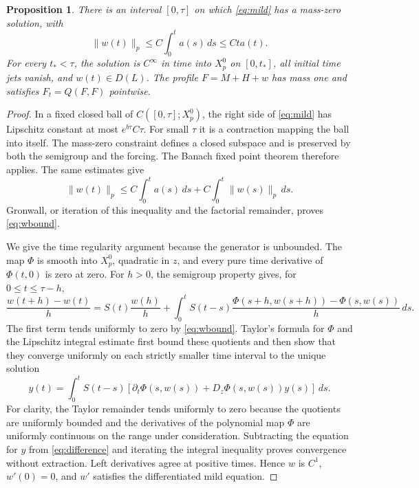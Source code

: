 \documentclass[11pt,a4paper]{article}
\numberwithin{equation}{section}
\newtheorem{proposition}[theorem]{Proposition}
\theoremstyle{remark}
\newcommand{\dd}{\,d}
\newcommand{\norm}[2]{\lVert #1\rVert_{#2}}
\begin{document}
\begin{proposition}\label{prop:signed}
There is an interval \([0,\tau]\) on which \eqref{eq:mild} has a
mass-zero solution, with
\begin{equation}\label{eq:wbound}
 \norm{w(t)}{p}\leq C\int_0^t a(s)\dd s\leq Ct a(t).
\end{equation}
For every \(t_*<\tau\), the solution is \(C^\infty\) in time into
\(X_p^0\) on \([0,t_*]\), all initial time jets vanish, and
\(w(t)\in D(L)\). The profile \(F=M+H+w\) has mass one and satisfies
\(F_t=Q(F,F)\) pointwise.
\end{proposition}
\begin{proof}
In a fixed closed ball of \(C([0,\tau];X_p^0)\), the right side of
\eqref{eq:mild} has Lipschitz constant at most \(e^{b\tau}C\tau\).
For small \(\tau\) it is a contraction mapping the ball into itself.
The mass-zero constraint defines a closed subspace and is preserved by
both the semigroup and the forcing. The Banach fixed point theorem
therefore applies. The same estimates give
\[
 \norm{w(t)}{p}\leq C\int_0^ta(s)\dd s
                     +C\int_0^t\norm{w(s)}{p}\dd s.
\]
Gronwall, or iteration of this inequality and the factorial remainder,
proves \eqref{eq:wbound}.

We give the time regularity argument because the generator is
unbounded. The map \(\Phi\) is smooth into \(X_p^0\), quadratic in \(z\),
and every pure time derivative of \(\Phi(t,0)\) is zero at zero.
For \(h>0\), the semigroup property gives, for \(0\leq t\leq\tau-h\),
\begin{equation}\label{eq:difference}
 \frac{w(t+h)-w(t)}h
 =S(t)\frac{w(h)}h+
 \int_0^tS(t-s)
 \frac{\Phi(s+h,w(s+h))-\Phi(s,w(s))}h\dd s.
\end{equation}
The first term tends uniformly to zero by \eqref{eq:wbound}.
Taylor's formula for \(\Phi\) and the Lipschitz integral estimate
first bound these quotients and then show that they converge uniformly
on each strictly smaller time interval to the unique solution
\[
 y(t)=\int_0^tS(t-s)
 [\partial_t\Phi(s,w(s))+D_z\Phi(s,w(s))y(s)]\dd s.
\]
For clarity, the Taylor remainder tends uniformly to zero because the
quotients are uniformly bounded and the derivatives of the polynomial
map \(\Phi\) are uniformly continuous on the range under consideration.
Subtracting the equation for \(y\) from \eqref{eq:difference} and
iterating the integral inequality proves convergence without extraction.
Left derivatives agree at positive times. Hence \(w\) is \(C^1\),
\(w'(0)=0\), and \(w'\) satisfies the differentiated mild equation.


\end{proof}
\end{document}
